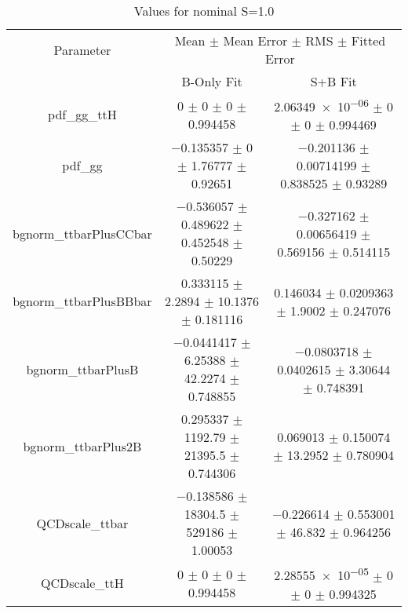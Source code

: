 \begin{table}
\centering
\caption{Values for nominal S=1.0}
\begin{tabular}{ccc}
\toprule
Parameter & \multicolumn{2}{c}{Mean $\pm$ Mean Error $\pm$ RMS $\pm$ Fitted Error}\\
 & B-Only Fit & S+B Fit\\
\midrule
pdf\_gg\_ttH & \num{0} $\pm$ \num{0} $\pm$ \num{0} $\pm$ \num{0.994458} & \num{2.06349e-06} $\pm$ \num{0} $\pm$ \num{0} $\pm$ \num{0.994469}\\
pdf\_gg & \num{-0.135357} $\pm$ \num{0} $\pm$ \num{1.76777} $\pm$ \num{0.92651} & \num{-0.201136} $\pm$ \num{0.00714199} $\pm$ \num{0.838525} $\pm$ \num{0.93289}\\
bgnorm\_ttbarPlusCCbar & \num{-0.536057} $\pm$ \num{0.489622} $\pm$ \num{0.452548} $\pm$ \num{0.50229} & \num{-0.327162} $\pm$ \num{0.00656419} $\pm$ \num{0.569156} $\pm$ \num{0.514115}\\
bgnorm\_ttbarPlusBBbar & \num{0.333115} $\pm$ \num{2.2894} $\pm$ \num{10.1376} $\pm$ \num{0.181116} & \num{0.146034} $\pm$ \num{0.0209363} $\pm$ \num{1.9002} $\pm$ \num{0.247076}\\
bgnorm\_ttbarPlusB & \num{-0.0441417} $\pm$ \num{6.25388} $\pm$ \num{42.2274} $\pm$ \num{0.748855} & \num{-0.0803718} $\pm$ \num{0.0402615} $\pm$ \num{3.30644} $\pm$ \num{0.748391}\\
bgnorm\_ttbarPlus2B & \num{0.295337} $\pm$ \num{1192.79} $\pm$ \num{21395.5} $\pm$ \num{0.744306} & \num{0.069013} $\pm$ \num{0.150074} $\pm$ \num{13.2952} $\pm$ \num{0.780904}\\
QCDscale\_ttbar & \num{-0.138586} $\pm$ \num{18304.5} $\pm$ \num{529186} $\pm$ \num{1.00053} & \num{-0.226614} $\pm$ \num{0.553001} $\pm$ \num{46.832} $\pm$ \num{0.964256}\\
QCDscale\_ttH & \num{0} $\pm$ \num{0} $\pm$ \num{0} $\pm$ \num{0.994458} & \num{2.28555e-05} $\pm$ \num{0} $\pm$ \num{0} $\pm$ \num{0.994325}\\
\bottomrule
\end{tabular}
\end{table}